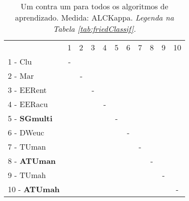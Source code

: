 \begin{table}[h]
\caption{Um contra um para todos os algoritmos de aprendizado. Medida: ALCKappa. \textit{Legenda na Tabela \ref{tab:friedClassif}.}}
\begin{center}\begin{tabular}{lcc|cc|cc|cc|cc}
 			& 1 & 2 & 3 & 4 & 5 & 6 & 7 & 8 & 9 & 10\\
1 - Clu  	& - &   &   &   &   &   &   &   &   &   \\
2 - Mar  	&   & - &   &   &   &   &   &   &   &   \\ \hline
3 - EERent	&   &   & - &   &   &   &   &   &   &   \\
4 - EERacu	&   &   &   & - &   &   &   &   &   &   \\ \hline
5 - \textbf{SGmulti}	&   &   &   &   & - &   &   &   &   &   \\
6 - DWeuc	&   &   &   &   &   & - &   &   &   &   \\ \hline
7 - TUman	&   &   &   &   &   &   & - &   &   &   \\
8 - \textbf{ATUman}	&   &   &   &   &   &   &   & - &   &   \\ \hline
9 - TUmah	&   &   &   &   &   &   &   &   & - &   \\
10 - \textbf{ATUmah}	&   &   &   &   &   &   &   &   &   & - \\ \hline\end{tabular}
\label{stratsALCKappaFriedAllRiscoReduxHalf}
\end{center}
\end{table}